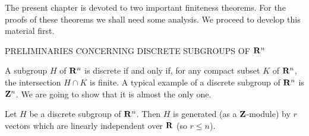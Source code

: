 \clearpage
{}%
\renewcommand{\chaptertitle}{IDEAL CLASSES AND THE UNIT THEOREM}

The present chapter is devoted to two important finiteness theorems. For the
proofs of these theorems we shall need some analysis. We proceed to develop
this material first.

%
        {PRELIMINARIES CONCERNING DISCRETE SUBGROUPS OF $\mathbf{R}^{n}$}

A subgroup $H$ of $\mathbf{R}^{n}$ is discrete if and only if, for any compact
subset $K$ of $\mathbf{R}^{n}$, the intersection $H\cap K$ is finite. A typical
example of a discrete subgroup of $\mathbf{R}^{n}$ is $\mathbf{Z}^{n}$. We are going to show
that it is almost the only one.

\begin{theorem}
\label{thm:IV.1.1}
Let $H$ be a discrete subgroup of $\mathbf{R}^{n}$. Then $H$ is generated (as a
$\mathbf{Z}$-module) by $r$ vectors which are linearly independent over $\mathbf{R}$ (so
$r\leq n$).
\end{theorem}

